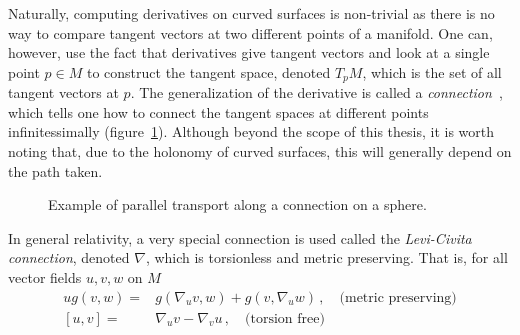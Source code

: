 Naturally, computing derivatives on curved surfaces is non-trivial as there is no way to compare tangent vectors at two different points of a manifold. One can, however, use the fact that derivatives give tangent vectors and look at a single point $p\in M$ to construct the tangent space, denoted $T_pM$, which is the set of all tangent vectors at $p$. The generalization of the derivative is called a \textit{connection}~\cite{baez_john_gauge_1994}, which tells one how to connect the tangent spaces at different points infinitessimally (figure~\ref{fig:parallel_transport}). Although beyond the scope of this thesis, it is worth noting that, due to the holonomy of curved surfaces, this will generally depend on the path taken.
\begin{figure}
    \centering
    \caption{Example of parallel transport along a connection on a sphere. }
    \label{fig:parallel_transport}
\end{figure}
In general relativity, a very special connection is used called the \textit{Levi-Civita connection}, denoted $\nabla$, which is torsionless and metric preserving. That is, for all vector fields $u,v,w$ on $M$
\begin{equation}
    \begin{split}
        u g(v,w) =& g(\nabla_u v, w)+g(v,\nabla_uw) \,,\quad \text{(metric preserving)} \\
        [u,v] =& \nabla_u v - \nabla_v u \,,\quad \text{(torsion free)}
    \end{split}
\end{equation}

